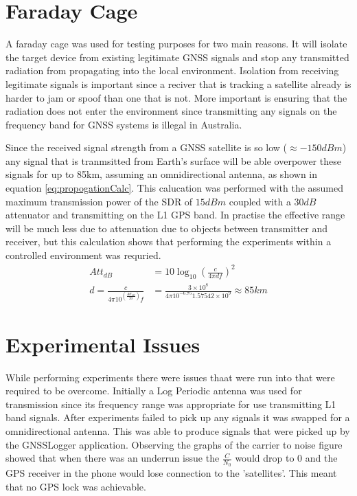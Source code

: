 \section{Faraday Cage}
A faraday cage was used for testing purposes for two main reasons. It will isolate the target device from existing legitimate GNSS signals and stop any transmitted
radiation from propagating into the local environment. Isolation from receiving legitimate signals is important since a reciver that is tracking a satellite already is
harder to jam or spoof than one that is not. More important is ensuring that the radiation does not enter the environment since transmitting any signals on the frequency
band for GNSS systems is illegal in Australia. 

Since the received signal strength from a GNSS satellite is so low ($\approx -150dBm$) any signal that is tranmsitted from Earth's surface will be able overpower these
signals for up to 85km, assuming an omnidirectional antenna, as shown in equation \ref{eq:propogationCalc}. This calucation was performed with the assumed maximum
transmission power of the SDR of $15 dBm$ coupled with a $30dB$ attenuator and transmitting on the L1 GPS band. In practise the effective range will be much less due to
attenuation due to objects between transmitter and receiver, but this calculation shows that performing the experiments within a controlled environment was requried.
\begin{equation}    
    \begin{split} \label{eq:propogationCalc}
        Att_{dB} &= 10 \log_{10}\left(\frac{c}{4\pi df}\right)^2 \\
        d = \frac{c}{4\pi 10^{\left(\frac{Att_{dB}}{20}\right)}f} &= \frac{3\times10^8}{4\pi 10^{-6.75}1.57542\times 10^9} \approx 85km
    \end{split}
\end{equation}

\section{Experimental Issues}
While performing experiments there were issues thaat were run into that were required to be overcome. Initially a Log Periodic antenna was used for transmission since its
frequency range was appropriate for use transmitting L1 band signals. After experiments failed to pick up any signals it was swapped for a omnidirectional antenna. This
was able to produce signals that were picked up by the GNSSLogger application. Observing the graphs of the carrier to noise figure showed that when there was an underrun
issue the $\frac{C}{N_0}$ would drop to 0 and the GPS receiver in the phone would lose connection to the 'satellites'. This meant that no GPS lock was achievable.  

